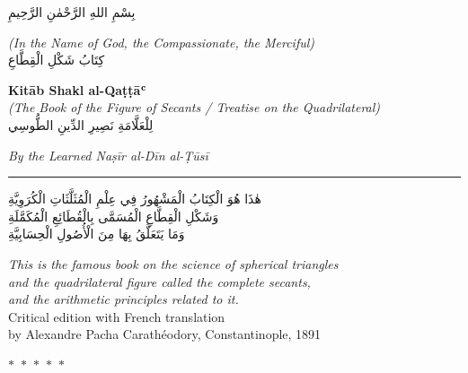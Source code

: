 \documentclass[11pt,a4paper]{article}
\theoremstyle{plain}
\theoremstyle{definition}
\theoremstyle{remark}
\newcommand{\shortline}{\noindent\rule{0.5\textwidth}{0.4pt}\par}
\newcommand{\ar}[1]{{\arabicfont\beginR #1\endR}}
\newcommand{\dblornament}{\begin{center}\textcolor{goldaccent}{$\ast$~$\ast$~$\ast$~$\ast$~$\ast$}\end{center}}
\begin{document}
\thispagestyle{empty}
\begin{center}
\vspace*{1.5cm}

\ar{\Large
بِسْمِ اللهِ الرَّحْمٰنِ الرَّحِيمِ}

\vspace{0.5cm}
{\small\textit{(In the Name of God, the Compassionate, the Merciful)}}\\[1cm]

\ar{\LARGE
كِتَابُ شَكْلِ الْقِطَّاعِ}

\vspace{0.3cm}
{\large\textbf{Kitāb Shakl al-Qaṭṭāʿ}}\\[0.2cm]
{\textit{(The Book of the Figure of Secants / Treatise on the Quadrilateral)}}\\[0.8cm]

\ar{\large
لِلْعَلَّامَةِ نَصِيرِ الدِّينِ الطُّوسِي}

\vspace{0.2cm}
{\textit{By the Learned Naṣīr al-Dīn al-Ṭūsī}}\\[1cm]

\shortline

\vspace{0.8cm}
\ar{\normalsize
هٰذَا هُوَ الْكِتَابُ الْمَشْهُورُ فِي عِلْمِ الْمُثَلَّثَاتِ الْكُرَوِيَّةِ \\
وَشَكْلِ الْقِطَّاعِ الْمُسَمَّى بِالْقُطَائِعِ الْمُكَمَّلَةِ \\
وَمَا يَتَعَلَّقُ بِهَا مِنَ الْأُصُولِ الْحِسَابِيَّةِ}

\vspace{0.5cm}
{\small\textit{This is the famous book on the science of spherical triangles}}\\
{\small\textit{and the quadrilateral figure called the complete secants,}}\\
{\small\textit{and the arithmetic principles related to it.}}\\[1.5cm]

{\small Critical edition with French translation}\\
{\small by Alexandre Pacha Carathéodory, Constantinople, 1891}\\[0.5cm]

\dblornament

\end{center}
\clearpage
\end{document}
